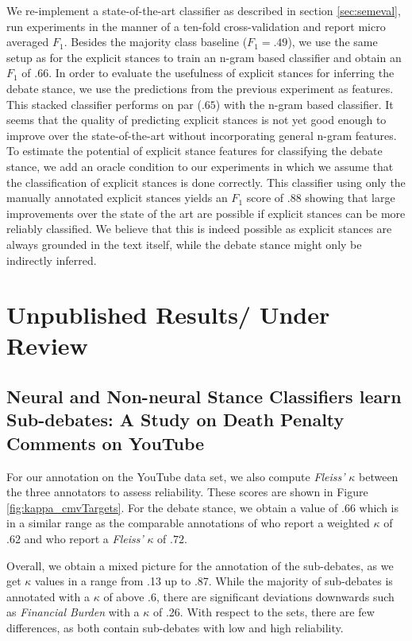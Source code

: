 \documentclass[11pt]{article}
\begin{document}
We re-implement a state-of-the-art classifier as described in section \ref{sec:semeval}, run experiments in the manner of a ten-fold cross-validation and report micro averaged $F_1$.
Besides the majority class baseline ($F_1=.49$), we use the same setup as for the explicit stances to train an n-gram based classifier and obtain an $F_1$ of $.66$.
In order to evaluate the usefulness of explicit stances for inferring the debate stance, we use the predictions from the previous experiment as features.
This stacked classifier performs on par ($.65$) with the n-gram based classifier.
It seems that the quality of predicting explicit stances is not yet good enough to improve over the state-of-the-art without incorporating general n-gram features.
To estimate the potential of explicit stance features for classifying the debate stance, we add an oracle condition to our experiments in which we assume that the classification of explicit stances is done correctly.
This classifier using only the manually annotated explicit stances yields an $F_1$ score of $.88$ showing that large improvements over the state of the art are possible if explicit stances can be more reliably classified.
We believe that this is indeed possible as explicit stances are always grounded in the text itself, while the debate stance might only be indirectly inferred.

\section{Unpublished Results/ Under Review}

\subsection{Neural and Non-neural Stance Classifiers learn Sub-debates: A Study on Death Penalty Comments on YouTube \cite{wojatzki2017youtube} }

For our annotation on the YouTube  data set, we also compute \textit{Fleiss'} $\kappa$  between the three annotators to assess reliability.
These scores are shown in Figure \ref{fig:kappa_cmvTargets}.
For the debate stance, we obtain a value of .66 which is in a similar range as the comparable annotations of  who report a weighted $\kappa$ of .62 and  who report a \textit{Fleiss'} $\kappa$ of $.72$.

Overall, we obtain a mixed picture for the annotation of the sub-debates, as we get $\kappa$ values in a range from .13 up to .87. 
While the majority of sub-debates is annotated with a $\kappa$ of above .6, there are significant deviations downwards such as \textit{Financial Burden} with a $\kappa$ of .26.
With respect to the sets, there are few differences, as both contain sub-debates with low and high reliability.
\end{document}
